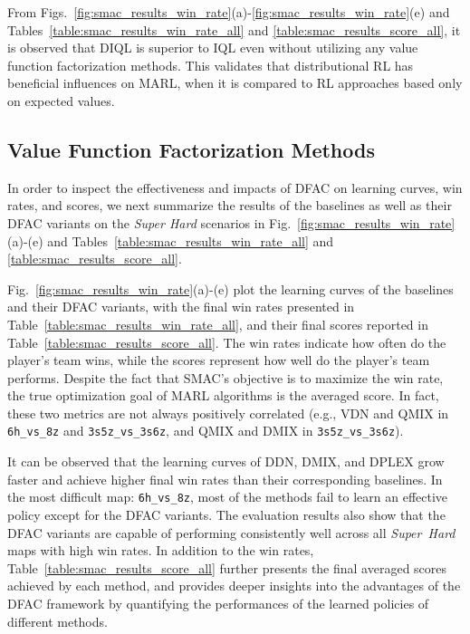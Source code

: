 \documentclass[twoside,11pt]{article}
\newcommand{\superhard}{\textit{Super~Hard}}
\newcommand{\diql}{DIQL}
\newcommand{\ddn}{DDN}
\newcommand{\dmix}{DMIX}
\newcommand{\dplex}{DPLEX}
\begin{document}
From Figs.~\ref{fig:smac_results_win_rate}(a)-\ref{fig:smac_results_win_rate}(e) and Tables~\ref{table:smac_results_win_rate_all} and \ref{table:smac_results_score_all}, it is observed that \diql{} is superior to IQL even without utilizing any value function factorization methods. This validates that distributional RL has beneficial influences on MARL, when it is compared to RL approaches based only on expected values.



\subsection{Value Function Factorization Methods}
\label{subsec:experiment_results_super_hard}

In order to inspect the effectiveness and impacts of DFAC on learning curves, win rates, and scores, we next summarize the results of the baselines as well as their DFAC variants on the \textit{Super Hard} scenarios in Fig.~\ref{fig:smac_results_win_rate}(a)-(e) and Tables~\ref{table:smac_results_win_rate_all} and \ref{table:smac_results_score_all}.

Fig.~\ref{fig:smac_results_win_rate}(a)-(e) plot the learning curves of the baselines and their DFAC variants, with the final win rates presented in Table~\ref{table:smac_results_win_rate_all}, and their final scores reported in Table~\ref{table:smac_results_score_all}. The win rates indicate how often do the player's team wins, while the scores represent how well do the player's team performs. Despite the fact that SMAC's objective is to maximize the win rate, the true optimization goal of MARL algorithms is the averaged score. In fact, these two metrics are not always positively correlated (e.g., VDN and QMIX in \texttt{6h\_vs\_8z} and \texttt{3s5z\_vs\_3s6z}, and QMIX and \dmix{} in \texttt{3s5z\_vs\_3s6z}).

It can be observed that the learning curves of \ddn{}, \dmix{}, and \dplex{} grow faster and achieve higher final win rates than their corresponding baselines. In the most difficult map: \texttt{6h\_vs\_8z}, most of the methods fail to learn an effective policy except for the DFAC variants. The evaluation results also show that the DFAC variants are capable of performing consistently well across all \superhard{} maps with high win rates. In addition to the win rates, Table~\ref{table:smac_results_score_all} further presents the final averaged scores achieved by each method, and provides deeper insights into the advantages of the DFAC framework by quantifying the performances of the learned policies of different methods.
\end{document}
